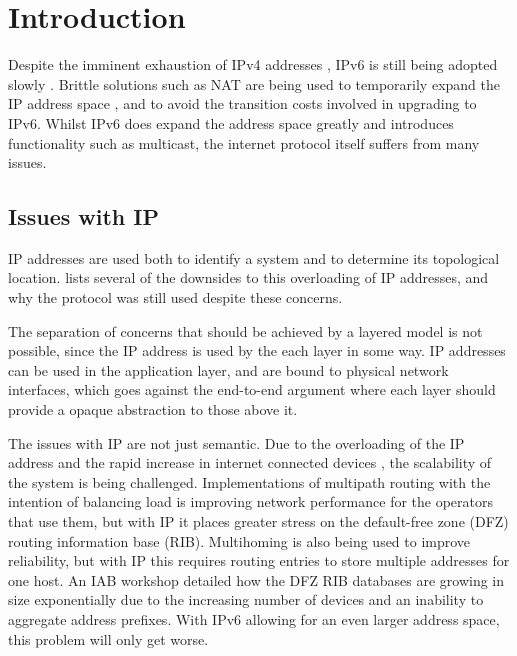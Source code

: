 \documentclass[12pt]{article}
\begin{document}
\newpage

\tableofcontents

\newpage
{}
\setcounter{page}{1} 

\section{Introduction}

Despite the imminent exhaustion of IPv4 addresses \cite{ripe_labs}, IPv6 is still being adopted slowly \cite{google_ipv6}. Brittle solutions such as NAT are being used to temporarily expand the IP address space , and to avoid the transition costs involved in upgrading to IPv6. Whilst IPv6 does expand the address space greatly and introduces functionality such as multicast, the internet protocol itself suffers from many issues. 

\subsection{Issues with IP}

IP addresses are used both to identify a system and to determine its topological location. \cite{briancarpenter2014} lists several of the downsides to this overloading of IP addresses, and why the protocol was still used despite these concerns. 

The separation of concerns that should be achieved by a layered model is not possible, since the IP address is used by the each layer in some way. IP addresses can be used in the application layer, and are bound to physical network interfaces, which goes against the end-to-end argument where each layer should provide a opaque abstraction to those above it.

The issues with IP are not just semantic. Due to the overloading of the IP address and the rapid increase in internet connected devices \cite{iot_stat}, the scalability of the system is being challenged. Implementations of multipath routing with the intention of balancing load is improving network performance for the operators that use them, but with IP it places greater stress on the default-free zone (DFZ) routing information base (RIB). Multihoming is also being used to improve reliability, but with IP this requires routing entries to store multiple addresses for one host. An IAB workshop \cite{rfc4984} detailed how the DFZ RIB databases are growing in size exponentially due to the increasing number of devices and an inability to aggregate address prefixes. With IPv6 allowing for an even larger address space, this problem will only get worse. 
\end{document}
